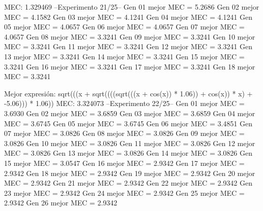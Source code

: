 MEC: 1.329469
--Experimento 
 21/25--
Gen 01 mejor MEC = 5.2686
Gen 02 mejor MEC = 4.1582
Gen 03 mejor MEC = 4.1241
Gen 04 mejor MEC = 4.1241
Gen 05 mejor MEC = 4.0657
Gen 06 mejor MEC = 4.0657
Gen 07 mejor MEC = 4.0657
Gen 08 mejor MEC = 3.3241
Gen 09 mejor MEC = 3.3241
Gen 10 mejor MEC = 3.3241
Gen 11 mejor MEC = 3.3241
Gen 12 mejor MEC = 3.3241
Gen 13 mejor MEC = 3.3241
Gen 14 mejor MEC = 3.3241
Gen 15 mejor MEC = 3.3241
Gen 16 mejor MEC = 3.3241
Gen 17 mejor MEC = 3.3241
Gen 18 mejor MEC = 3.3241

Mejor expresión: sqrt(((x + sqrt((((sqrt(((x + cos(x)) * 1.06)) + cos(x)) * x) + -5.06))) * 1.06))
MEC: 3.324073
--Experimento 
 22/25--
Gen 01 mejor MEC = 3.6930
Gen 02 mejor MEC = 3.6859
Gen 03 mejor MEC = 3.6859
Gen 04 mejor MEC = 3.6745
Gen 05 mejor MEC = 3.6745
Gen 06 mejor MEC = 3.4851
Gen 07 mejor MEC = 3.0826
Gen 08 mejor MEC = 3.0826
Gen 09 mejor MEC = 3.0826
Gen 10 mejor MEC = 3.0826
Gen 11 mejor MEC = 3.0826
Gen 12 mejor MEC = 3.0826
Gen 13 mejor MEC = 3.0826
Gen 14 mejor MEC = 3.0826
Gen 15 mejor MEC = 3.0547
Gen 16 mejor MEC = 2.9342
Gen 17 mejor MEC = 2.9342
Gen 18 mejor MEC = 2.9342
Gen 19 mejor MEC = 2.9342
Gen 20 mejor MEC = 2.9342
Gen 21 mejor MEC = 2.9342
Gen 22 mejor MEC = 2.9342
Gen 23 mejor MEC = 2.9342
Gen 24 mejor MEC = 2.9342
Gen 25 mejor MEC = 2.9342
Gen 26 mejor MEC = 2.9342


